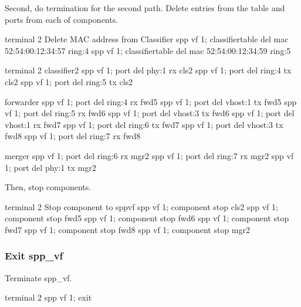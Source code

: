 \documentclass[a4paper,11pt,openany,oneside,english]{sphinxmanual}
\begin{document}
Second, do termination for the second path.
Delete entries from the table and ports from each of components.

\begin{sphinxVerbatim}[commandchars=\\\{\},formatcom=\footnotesize]
\PYGZsh{} terminal 2
\PYGZsh{} Delete MAC address from Classifier
spp \PYGZgt{} vf 1; classifier\PYGZus{}table del mac 52:54:00:12:34:57 ring:4
spp \PYGZgt{} vf 1; classifier\PYGZus{}table del mac 52:54:00:12:34:59 ring:5
\end{sphinxVerbatim}

\begin{sphinxVerbatim}[commandchars=\\\{\},formatcom=\footnotesize]
\PYGZsh{} terminal 2
\PYGZsh{} classifier2
spp \PYGZgt{} vf 1; port del phy:1 rx cls2
spp \PYGZgt{} vf 1; port del ring:4 tx cls2
spp \PYGZgt{} vf 1; port del ring:5 tx cls2

\PYGZsh{} forwarder
spp \PYGZgt{} vf 1; port del ring:4 rx fwd5
spp \PYGZgt{} vf 1; port del vhost:1 tx fwd5
spp \PYGZgt{} vf 1; port del ring:5 rx fwd6
spp \PYGZgt{} vf 1; port del vhost:3 tx fwd6
spp \PYGZgt{} vf 1; port del vhost:1 rx fwd7
spp \PYGZgt{} vf 1; port del ring:6 tx fwd7
spp \PYGZgt{} vf 1; port del vhost:3 tx fwd8
spp \PYGZgt{} vf 1; port del ring:7 rx fwd8

\PYGZsh{} merger
spp \PYGZgt{} vf 1; port del ring:6 rx mgr2
spp \PYGZgt{} vf 1; port del ring:7 rx mgr2
spp \PYGZgt{} vf 1; port del phy:1 tx mgr2
\end{sphinxVerbatim}

Then, stop components.

\begin{sphinxVerbatim}[commandchars=\\\{\},formatcom=\footnotesize]
\PYGZsh{} terminal 2
\PYGZsh{} Stop component to spp\PYGZus{}vf
spp \PYGZgt{} vf 1; component stop cls2
spp \PYGZgt{} vf 1; component stop fwd5
spp \PYGZgt{} vf 1; component stop fwd6
spp \PYGZgt{} vf 1; component stop fwd7
spp \PYGZgt{} vf 1; component stop fwd8
spp \PYGZgt{} vf 1; component stop mgr2
\end{sphinxVerbatim}


\subsubsection{Exit spp\_vf}
\label{\detokenize{usecases/spp_vf:exit-spp-vf}}
Terminate spp\_vf.

\begin{sphinxVerbatim}[commandchars=\\\{\},formatcom=\footnotesize]
\PYGZsh{} terminal 2
spp \PYGZgt{} vf 1; exit
\end{sphinxVerbatim}
\end{document}
